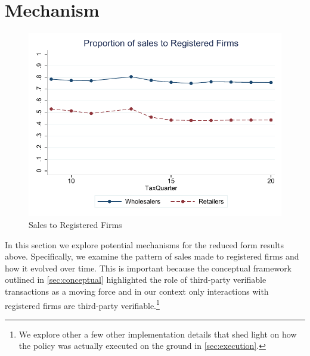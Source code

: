 \section{Mechanism}\label{sec:1-mechanism}
\begin{figure}[t!] 
\includegraphics{graphs/ProportionSalesRegistered.pdf}
\caption{Sales to Registered Firms}
\label{fig:salesregistered}
\end{figure}

In this section we explore potential mechanisms for the reduced form results above. Specifically, we examine the pattern of sales made to registered firms and how it evolved over time. This is important because the conceptual framework outlined in \cref{sec:conceptual} highlighted the role of third-party verifiable transactions as a moving force and in our context only interactions with registered firms are third-party verifiable.\footnote{We explore other a few other implementation details that shed light on how the policy was actually executed on the ground in \cref{sec:execution}.}

